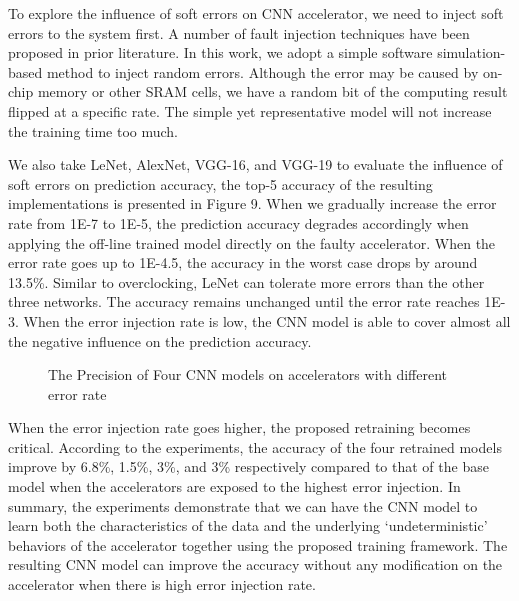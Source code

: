   To explore the influence of soft errors on CNN accelerator, we need to inject soft errors to the system first. 
A number of fault injection techniques have been proposed in prior literature. In this work, we adopt 
a simple software simulation- based method to inject random errors. Although the error may be caused by 
on-chip memory or other SRAM cells, we have a random bit of the computing result flipped at a specific rate. 
The simple yet representative model will not increase the training time too much.

  We also take LeNet, AlexNet, VGG-16, and VGG-19 to evaluate the influence of soft errors on prediction accuracy,
the top-5 accuracy of the resulting implementations is presented in Figure 9. When we gradually 
increase the error rate from 1E-7 to 1E-5, the prediction accuracy degrades accordingly when applying the off-line 
trained model directly on the faulty accelerator. When the error rate goes up to 1E-4.5, 
the accuracy in the worst case drops by around 13.5\%. Similar to overclocking, LeNet can tolerate 
more errors than the other three networks. The accuracy remains unchanged until the error rate reaches 1E-3. 
When the error injection rate is low, the CNN model is able to cover almost all the negative influence 
on the prediction accuracy.

\begin{figure}
        \center
        \qquad
        \qquad
        \qquad
        \caption{The Precision of Four CNN models on accelerators with different error rate}
        \label{fig:softerror accuracy}
\end{figure}

  When the error injection rate goes higher, the proposed retraining becomes critical. 
According to the experiments, the accuracy of the four retrained models improve by 6.8\%, 1.5\%, 3\%, and 3\% 
respectively compared to that of the base model when the accelerators are exposed to the highest 
error injection. In summary, the experiments demonstrate that we can have the CNN model to learn 
both the characteristics of the data and the underlying ‘undeterministic’ behaviors of the accelerator 
together using the proposed training framework. The resulting CNN model can improve the accuracy 
without any modification on the accelerator when there is high error injection rate.  


